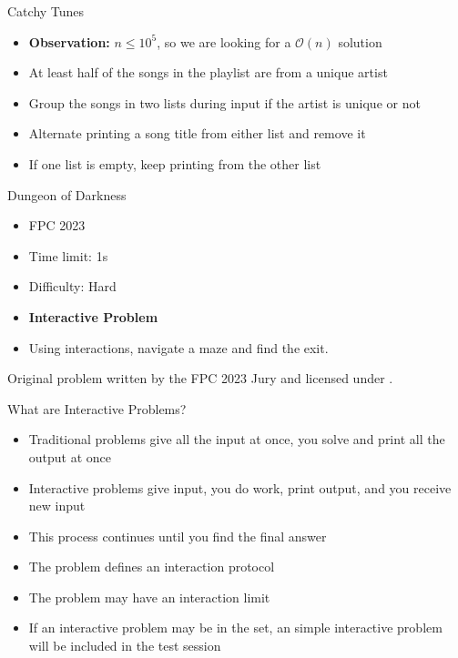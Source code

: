 \documentclass[11pt,pdf, aspectratio=169]{beamer}
\begin{document}
  \begin{frame}{Catchy Tunes}
    \begin{itemize}
      \item<1-> \textbf{Observation:} $n \leq 10^5$, so we are looking for a $\mathcal{O}(n)$ solution
      \item<1-> At least half of the songs in the playlist are from a unique artist
      \item<2-> Group the songs in two lists during input if the artist is unique or not
      \item<3-> Alternate printing a song title from either list and remove it
      \item<3-> If one list is empty, keep printing from the other list
    \end{itemize}
  \end{frame}
  \begin{frame}{Dungeon of Darkness}
    \begin{itemize}
      \item FPC 2023
      \item Time limit: 1s
      \item Difficulty: Hard
      \item \textbf{Interactive Problem}
      \item Using interactions, navigate a maze and find the exit.
    \end{itemize}
    Original problem written by the FPC 2023 Jury and licensed under \doclicenseLongNameRef.

    \doclicenseImage

  \end{frame}
  \begin{frame}{What are Interactive Problems?}
    \begin{itemize}
      \item Traditional problems give all the input at once, you solve and print all the output at once
      \item Interactive problems give input, you do work, print output, and you receive new input
      \item This process continues until you find the final answer
      \item The problem defines an interaction protocol
      \item The problem may have an interaction limit
      \item If an interactive problem may be in the set, an simple interactive problem will be included in the test session
    \end{itemize}
  \end{frame}
\end{document}
